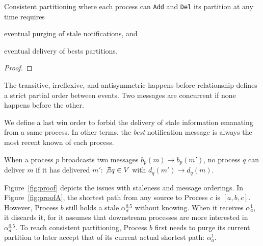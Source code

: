 


\begin{corollary}
  Consistent partitioning where each process can \texttt{Add} and
  \texttt{Del} its partition at any time requires 
  \begin{inparaenum}[(i)]
  \item eventual purging of stale notifications, and
  \item eventual delivery of bests partitions.
  \end{inparaenum}
\end{corollary}

\begin{proof}
\end{proof}



\begin{definition}
  The transitive, irreflexive, and antisymmetric happens-before
  relationship defines a strict partial order between events. Two
  messages are concurrent if none happens before the other.
\end{definition}

We define a last win order to forbid the delivery of stale information
emanating from a same process. In other terms, the \emph{best}
notification message is always the most recent known of each process.
 
\begin{definition}
  When a process $p$ broadcasts two messages $b_p(m) \rightarrow
  b_p(m')$, no process $q$ can deliver $m$ if it has delivered $m'$:
  $\not\exists q \in V$ with $d_q(m') \rightarrow d_q(m)$.
\end{definition}



Figure~\ref{fig:proof} depicts the issues with staleness and message
orderings. In Figure~\ref{fig:proofA}, the shortest path from any
source to Process $c$ is $[a, b, c]$. However, Process $b$ still holds
a stale $\alpha_d^{0.5}$ without knowing. When it receives
$\alpha_a^1$, it discards it, for it assumes that downstream processes
are more interested in $\alpha_d^{0.5}$. To reach consistent
partitioning, Process $b$ first needs to purge its current partition
to later accept that of its current actual shortest path:
$\alpha_a^1$.


